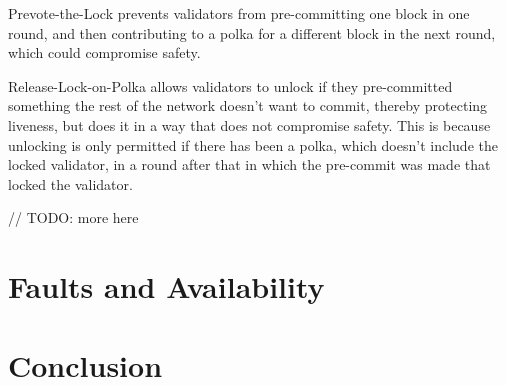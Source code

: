 Prevote-the-Lock prevents validators from pre-committing one block in one round, 
and then contributing to a polka for a different block in the next round, 
which could compromise safety.

Release-Lock-on-Polka allows validators to unlock if they pre-committed something the rest of the network doesn't want to commit,
thereby protecting liveness, but does it in a way that does not compromise safety.
This is because unlocking is only permitted if there has been a polka, which doesn't include the locked validator,
in a round after that in which the pre-commit was made that locked the validator.

// TODO: more here

\section{Faults and Availability}

\section{Conclusion}

